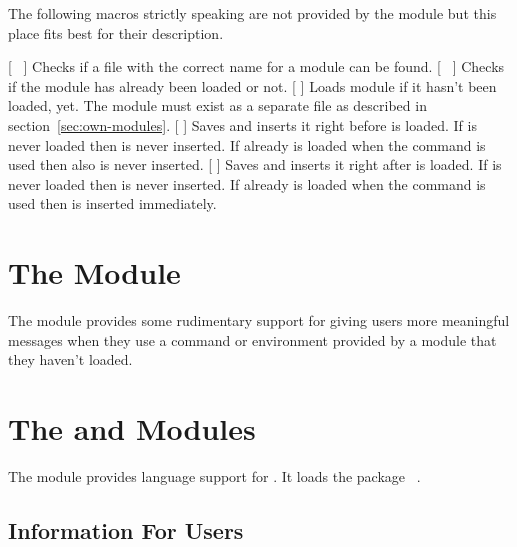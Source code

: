 \documentclass{chemmacros-manual}
\begin{document}
The following macros strictly speaking are not provided by the
 module but this place fits best for their description.
\begin{commands}
  \expandable{}[\TF\ 
   ]
    Checks if a file with the correct name for a module  can be
    found.
  \expandable{}[\TF\ 
   ]
    Checks if the module  has already been loaded or not.
  [ ]
    Loads module  if it hasn't been loaded, yet.  The module must
    exist as a separate file as described in section~\ref{sec:own-modules}.
  [  ]
    Saves  and inserts it right before
     is loaded.  If  is never loaded then
     is never inserted.  If  already is loaded when
    the command is used then  also is never inserted.
  [  ]
    Saves  and inserts it right after
     is loaded.  If  is never loaded then
     is never inserted.  If  already is loaded when
    the command is used then  is inserted immediately.
\end{commands}

\section{The  Module}\label{sec:errorcheck-module}
The  module provides some rudimentary
support for giving users more meaningful messages when they use a command or
environment provided by a module that they haven't loaded.

\section{The  and  Modules}\label{sec:lang-module}

The  module provides language support for \chemmacros.  It
loads the package ~\cite{pkg:translations}.

\subsection{Information For Users}\label{sec:information-users}
\end{document}
